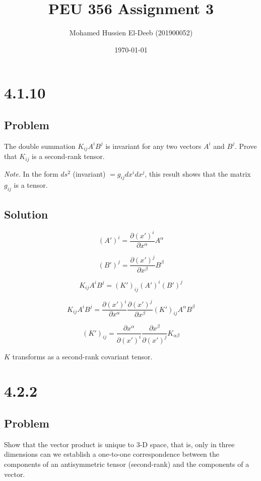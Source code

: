 \documentclass[12pt]{article}
\title{PEU 356 Assignment 3}
\author{Mohamed Hussien El-Deeb (201900052)}
\date{\today}
\begin{document}
\maketitle
\tableofcontents
\hypersetup{linkcolor=RoyalBlue4}

\newpage
\section{4.1.10}

\subsection{Problem}

The double summation \( K_{ij} A^i B^j \) is invariant for any two vectors \( A^i \) and \( B^j \). Prove that \( K_{ij} \) is a second-rank tensor.

\textit{Note.} In the form \( ds^2 \) (invariant) \( = g_{ij} dx^i dx^j \), this result shows that the matrix \( g_{ij} \) is a tensor.

\subsection{Solution}

\[
    {(A')}^i = \frac{\partial {(x')}^i}{\partial x^\alpha} A^\alpha
\]

\[
    {(B')}^j = \frac{\partial {(x')}^j}{\partial x^\beta} B^\beta
\]

\[
    K_{ij} A^i B^j = {(K')}_{ij} {(A')}^i {(B')}^j
\]

\[
    K_{ij} A^i B^j = \frac{\partial {(x')}^i}{\partial x^\alpha} \frac{\partial {(x')}^j}{\partial x^\beta} {(K')}_{ij}  A^\alpha B^\beta
\]

\[
    {(K')}_{ij} = \frac{\partial x^\alpha}{\partial {(x')}^i} \frac{\partial x^\beta}{\partial {(x')}^j} K_{\alpha \beta}
\]

\(K\) transforms as a second-rank covariant tensor.

\newpage
\section{4.2.2}

\subsection{Problem}

Show that the vector product is unique to 3-D space, that is, only in three dimensions can
we establish a one-to-one correspondence between the components of an antisymmetric
tensor (second-rank) and the components of a vector.
\end{document}
